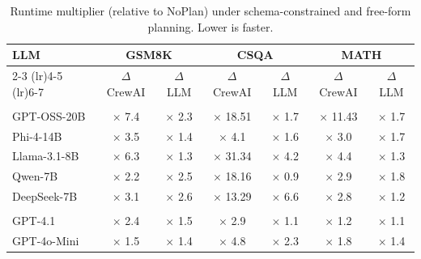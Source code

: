 \setlength{\tabcolsep}{5.pt}
\begin{table}[t]
\centering
\scriptsize
\caption{Runtime multiplier (relative to NoPlan) under schema-constrained and free-form planning. Lower is faster.}
\vspace{-3mm}
\renewcommand{\arraystretch}{0.9}
\label{tab:reasoning-time-mult}
\begin{tabular}{l|cc|cc|cc}
\toprule
\multirow{2}{*}{\textbf{LLM}} & \multicolumn{2}{c}{\textbf{GSM8K}} & \multicolumn{2}{c}{\textbf{CSQA}} & \multicolumn{2}{c}{\textbf{MATH}} \\
\cmidrule(lr){2-3} \cmidrule(lr){4-5} \cmidrule(lr){6-7}
 & $\Delta$ CrewAI & $\Delta$ LLM & $\Delta$ CrewAI & $\Delta$ LLM & $\Delta$ CrewAI & $\Delta$ LLM \\
\midrule
\rowcolor{gray!20} \multicolumn{7}{c}{\textbf{Local Models}} \\
GPT-OSS-20B & $\times$ 7.4 & $\times$ 2.3 & $\times$ 18.51 & $\times$ 1.7 & $\times$ 11.43 & $\times$ 1.7 \\
Phi-4-14B & $\times$ 3.5 & $\times$ 1.4 & $\times$ 4.1 & $\times$ 1.6 & $\times$ 3.0 & $\times$ 1.7 \\
Llama-3.1-8B & $\times$ 6.3 & $\times$ 1.3 & $\times$ 31.34 & $\times$ 4.2 & $\times$ 4.4 & $\times$ 1.3 \\
Qwen-7B & $\times$ 2.2 & $\times$ 2.5 & $\times$ 18.16 & $\times$ 0.9 & $\times$ 2.9 & $\times$ 1.8 \\
DeepSeek-7B & $\times$ 3.1 & $\times$ 2.6 & $\times$ 13.29 & $\times$ 6.6 & $\times$ 2.8 & $\times$ 1.2 \\
\rowcolor{gray!20} \multicolumn{7}{c}{\textbf{Remote Models}} \\
GPT-4.1 & $\times$ 2.4 & $\times$ 1.5 & $\times$ 2.9 & $\times$ 1.1 & $\times$ 1.2 & $\times$ 1.1 \\
GPT-4o-Mini & $\times$ 1.5 & $\times$ 1.4 & $\times$ 4.8 & $\times$ 2.3 & $\times$ 1.8 & $\times$ 1.4 \\
\bottomrule
\end{tabular}
\end{table}
